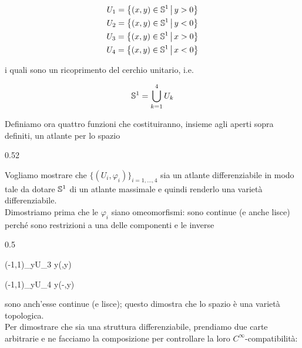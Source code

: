 \begin{gather}
	U_{1} = \left\{ (x,y) \in \S^{1} \st y > 0 \right\} \\
	U_{2} = \left\{ (x,y) \in \S^{1} \st y < 0 \right\} \\
	U_{3} = \left\{ (x,y) \in \S^{1} \st x > 0 \right\} \\
	U_{4} = \left\{ (x,y) \in \S^{1} \st x < 0 \right\}
\end{gather}

i quali sono un ricoprimento del cerchio unitario, i.e.

\begin{equation}
	\S^{1} = \bigcup_{k=1}^{4} U_{k}
\end{equation}

Definiamo ora quattro funzioni che costituiranno, insieme agli aperti sopra definiti, un atlante per lo spazio

	{0.52}{%
		}

Vogliamo mostrare che $ \{(U_{i},\varphi_{i})\}_{i=1,\dots,4} $ sia un atlante differenziabile in modo tale da dotare $ \S^{1} $ di un atlante massimale e quindi renderlo una varietà differenziabile. \\
Dimostriamo prima che le $ \varphi_{i} $ siano omeomorfismi: sono continue (e anche lisce) perché sono restrizioni a una delle componenti e le inverse

	{0.5}{%
				{(-1,1)_{y}}{U_{3}}
				{y}{(,y)}
			
				{(-1,1)_{y}}{U_{4}}
				{y}{(-,y)}
			}

sono anch'esse continue (e lisce); questo dimostra che lo spazio è una varietà topologica. \\
Per dimostrare che sia una struttura differenziabile, prendiamo due carte arbitrarie e ne facciamo la composizione per controllare la loro $ C^{\infty} $-compatibilità:

